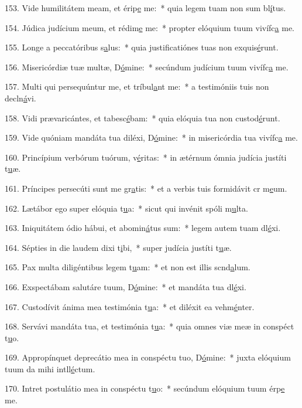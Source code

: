 153. Vide humilitátem meam, et érip\uline{e} me:~* quia legem tuam non sum bl\uline{í}tus.\par 
154. Júdica judícium meum, et rédim\uline{e} me:~* propter elóquium tuum vivífc\uline{a} me.\par 
155. Longe a peccatóribus s\uline{a}lus:~* quia justificatiónes tuas non exquis\uline{é}runt.\par 
156. Misericórdiæ tuæ multæ, D\uline{ó}mine:~* secúndum judícium tuum vivífc\uline{a} me.\par 
157. Multi qui persequúntur me, et tríbul\uline{a}nt me:~* a testimóniis tuis non decln\uline{á}vi.\par 
158. Vidi prævaricántes, et tabesc\uline{é}bam:~* quia elóquia tua non custod\uline{é}runt.\par 
159. Vide quóniam mandáta tua diléxi, D\uline{ó}mine:~* in misericórdia tua vivífc\uline{a} me.\par 
160. Princípium verbórum tuórum, v\uline{é}ritas:~* in ætérnum ómnia judícia justíti t\uline{u}æ.\par 
161. Príncipes persecúti sunt me gr\uline{a}tis:~* et a verbis tuis formidávit cr m\uline{e}um.\par 
162. Lætábor ego super elóquia t\uline{u}a:~* sicut qui invénit spóli m\uline{u}lta.\par 
163. Iniquitátem ódio hábui, et abomin\uline{á}tus sum:~* legem autem tuam dl\uline{é}xi.\par 
164. Sépties in die laudem dixi t\uline{i}bi,~* super judícia justíti t\uline{u}æ.\par 
165. Pax multa diligéntibus legem t\uline{u}am:~* et non est illis scnd\uline{a}lum.\par 
166. Exspectábam salutáre tuum, D\uline{ó}mine:~* et mandáta tua dl\uline{é}xi.\par 
167. Custodívit ánima mea testimónia t\uline{u}a:~* et diléxit ea vehm\uline{é}nter.\par 
168. Servávi mandáta tua, et testimónia t\uline{u}a:~* quia omnes viæ meæ in conspéct t\uline{u}o.\par 
169. Appropínquet deprecátio mea in conspéctu tuo, D\uline{ó}mine:~* juxta elóquium tuum da mihi intll\uline{é}ctum.\par 
170. Intret postulátio mea in conspéctu t\uline{u}o:~* secúndum elóquium tuum érp\uline{e} me.\par 
